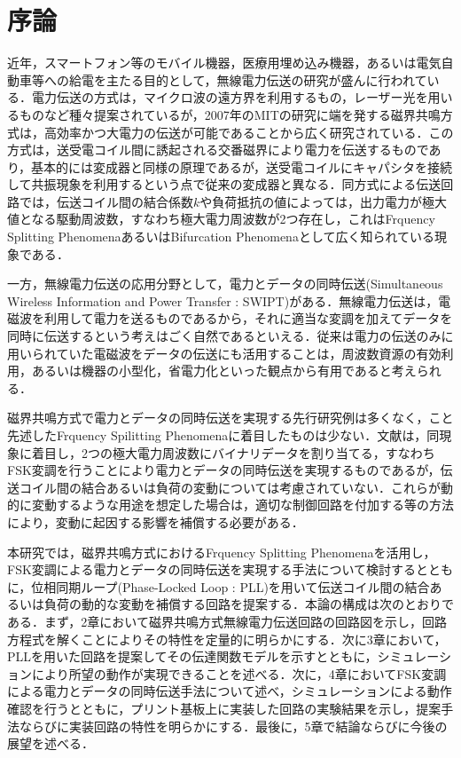 \chapter{序論}
近年，スマートフォン等のモバイル機器，医療用埋め込み機器，あるいは電気自動車等への給電を主たる目的として，無線電力伝送の研究が盛んに行われている．電力伝送の方式は，マイクロ波の遠方界を利用するもの\cite{Saito2013}，レーザー光\cite{Duncan2016}を用いるものなど種々提案されているが，2007年のMITの研究\cite{Kurs2007}に端を発する磁界共鳴方式は，高効率かつ大電力の伝送が可能であることから広く研究されている\cite{Anyapo2017,Fu2016,Iordache2015,Tsuchida2018a,Tsuchida2018,Zhao2017,Wenxian2014,Imano2014,Li2015,Narusue2015,Gati2015,Jiwariyavej2015,Zhen2019,Awai2012,Hosotani2012,Yang2017,Chaidee2017,Cenk2017,Imura2017,Fujita2019a}．この方式は，送受電コイル間に誘起される交番磁界により電力を伝送するものであり，基本的には変成器と同様の原理であるが，送受電コイルにキャパシタを接続して共振現象を利用するという点で従来の変成器と異なる．同方式による伝送回路では，伝送コイル間の結合係数$k$や負荷抵抗の値によっては，出力電力が極大値となる駆動周波数，すなわち極大電力周波数が2つ存在し，これはFrquency Splitting PhenomenaあるいはBifurcation Phenomenaとして広く知られている現象である\cite{Wang2004,Hoeher2019,Niu2013}．\par
一方，無線電力伝送の応用分野として，電力とデータの同時伝送(Simultaneous Wireless Information and Power Transfer : SWIPT)がある\cite{Yakovlev2012,Krikidis2014,Kim2019,Wu2015,Ishii2018,Nguyen2015,Hoeher2019,LotfiNavaii2018,Fujita2019b}．無線電力伝送は，電磁波を利用して電力を送るものであるから，それに適当な変調を加えてデータを同時に伝送するという考えはごく自然であるといえる．従来は電力の伝送のみに用いられていた電磁波をデータの伝送にも活用することは，周波数資源の有効利用，あるいは機器の小型化，省電力化といった観点から有用であると考えられる．\par
磁界共鳴方式で電力とデータの同時伝送を実現する先行研究例は多くなく，こと先述したFrquency Spilitting Phenomenaに着目したものは少ない．文献\cite{Hoeher2019}は，同現象に着目し，2つの極大電力周波数にバイナリデータを割り当てる，すなわちFSK変調を行うことにより電力とデータの同時伝送を実現するものであるが，伝送コイル間の結合あるいは負荷の変動については考慮されていない．これらが動的に変動するような用途を想定した場合は，適切な制御回路を付加する等の方法により，変動に起因する影響を補償する必要がある．\par 
本研究では，磁界共鳴方式におけるFrquency Splitting Phenomenaを活用し，FSK変調による電力とデータの同時伝送を実現する手法について検討するとともに，位相同期ループ(Phase-Locked Loop : PLL)を用いて伝送コイル間の結合あるいは負荷の動的な変動を補償する回路を提案する．本論の構成は次のとおりである．まず，2章において磁界共鳴方式無線電力伝送回路の回路図を示し，回路方程式を解くことによりその特性を定量的に明らかにする．次に3章において，PLLを用いた回路を提案してその伝達関数モデルを示すとともに，シミュレーションにより所望の動作が実現できることを述べる．次に，4章においてFSK変調による電力とデータの同時伝送手法について述べ，シミュレーションによる動作確認を行うとともに，プリント基板上に実装した回路の実験結果を示し，提案手法ならびに実装回路の特性を明らかにする．最後に，5章で結論ならびに今後の展望を述べる．
